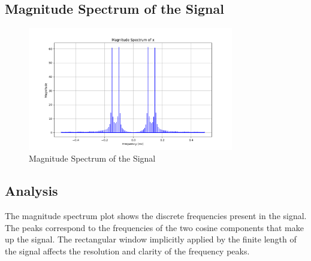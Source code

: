 \subsection*{Magnitude Spectrum of the Signal}
\begin{figure}[h]
    \centering
    \includegraphics[width=0.8\textwidth]{fig/ex5_a_magnitude_spectrum.png}
    \caption{Magnitude Spectrum of the Signal}
    \label{fig:ex5_a_magnitude_spectrum}
\end{figure}

\subsection*{Analysis}
The magnitude spectrum plot shows the discrete frequencies present in the signal. The peaks correspond to the frequencies of the two cosine components that make up the signal. The rectangular window implicitly applied by the finite length of the signal affects the resolution and clarity of the frequency peaks.

